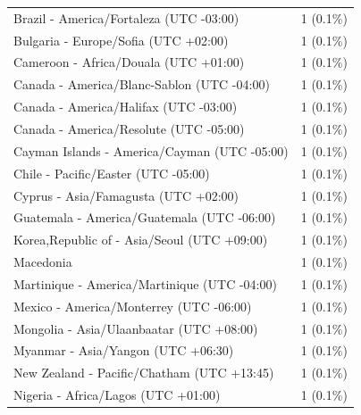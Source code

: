 \begin{appendix}
\begin{table}
{\begin{tabular}[t]{ll}
\hspace{1em}Brazil - America/Fortaleza (UTC -03:00) & 1 (0.1\%)\\
\hspace{1em}Bulgaria - Europe/Sofia (UTC +02:00) & 1 (0.1\%)\\
\hspace{1em}Cameroon - Africa/Douala (UTC +01:00) & 1 (0.1\%)\\
\hspace{1em}Canada - America/Blanc-Sablon (UTC -04:00) & 1 (0.1\%)\\
\addlinespace
\hspace{1em}Canada - America/Halifax (UTC -03:00) & 1 (0.1\%)\\
\hspace{1em}Canada - America/Resolute (UTC -05:00) & 1 (0.1\%)\\
\hspace{1em}Cayman Islands - America/Cayman (UTC -05:00) & 1 (0.1\%)\\
\hspace{1em}Chile - Pacific/Easter (UTC -05:00) & 1 (0.1\%)\\
\hspace{1em}Cyprus - Asia/Famagusta (UTC +02:00) & 1 (0.1\%)\\
\addlinespace
\hspace{1em}Guatemala - America/Guatemala (UTC -06:00) & 1 (0.1\%)\\
\hspace{1em}Korea,Republic of - Asia/Seoul (UTC +09:00) & 1 (0.1\%)\\
\hspace{1em}Macedonia & 1 (0.1\%)\\
\hspace{1em}Martinique - America/Martinique (UTC -04:00) & 1 (0.1\%)\\
\hspace{1em}Mexico - America/Monterrey (UTC -06:00) & 1 (0.1\%)\\
\addlinespace
\hspace{1em}Mongolia - Asia/Ulaanbaatar (UTC +08:00) & 1 (0.1\%)\\
\hspace{1em}Myanmar - Asia/Yangon (UTC +06:30) & 1 (0.1\%)\\
\hspace{1em}New Zealand - Pacific/Chatham (UTC +13:45) & 1 (0.1\%)\\
\hspace{1em}Nigeria - Africa/Lagos (UTC +01:00) & 1 (0.1\%)\\

\end{tabular}}
\end{table}
\end{appendix}
